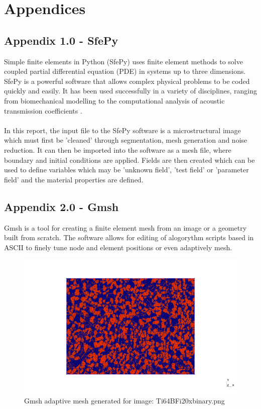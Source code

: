 \documentclass[\report.tex]{subfiles}
\begin{document}
\section{Appendices}

\subsection{Appendix 1.0 - SfePy}
Simple finite elements in Python (SfePy) uses finite element methods to solve coupled partial differential equation (PDE) in systems up to three dimensions. SfePy is a powerful software that allows complex physical problems to be coded quickly and easily. It has been used successfully in a variety of disciplines, ranging from biomechanical modelling \cite{biomedapplication} to the computational analysis of acoustic transmission coefficients \cite{AcousticTransmission}.\\ \\In this report, the input file to the SfePy software is a microstructural image which must first be 'cleaned' through segmentation, mesh generation and noise reduction. It can then be imported into the software as a mesh file, where boundary and initial conditions are applied. Fields are then created which can be used to define variables which may be 'unknown field', 'test field' or 'parameter field' \cite{FEMinSfePy} and the material properties are defined.

\subsection{Appendix 2.0 - Gmsh}
Gmsh is a tool for creating a finite element mesh from an image or a geometry built from scratch. The software allows for editing of alogorythm scripts based in ASCII to finely tune node and element positions or even adaptively mesh.
\begin{figure}[h!]
    \centering
    \includegraphics[width=17cm]{images/out.png}
    \caption{Gmsh adaptive mesh generated for image: Ti64BFi20xbinary.png}
    \label{fig:gmsh}
\end{figure}
\end{document}
